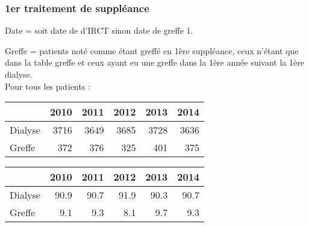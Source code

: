 \documentclass[11pt,a4paper]{article}\usepackage[]{graphicx}\usepackage[]{color}
\begin{document}
% 
% 
% 
% 


    \subsubsection{1er traitement de suppléance}

Date = soit date de d'IRCT sinon date de greffe 1. 

Greffe = patients noté comme étant greffé en 1ère suppléance, ceux n'étant que dans la table greffe et ceux ayant eu une greffe dans la 1ère année suivant la 1ère dialyse.
~\\

Pour tous les patients :

\begin{table}[H]
\centering
\begin{tabular}{lrrrrr}
  \hline
 & 2010 & 2011 & 2012 & 2013 & 2014 \\ 
  \hline
Dialyse & 3716 & 3649 & 3685 & 3728 & 3636 \\ 
  Greffe & 372 & 376 & 325 & 401 & 375 \\ 
   \hline
\end{tabular}
\end{table}
\begin{table}[H]
\centering
\begin{tabular}{lrrrrr}
  \hline
 & 2010 & 2011 & 2012 & 2013 & 2014 \\ 
  \hline
Dialyse & 90.9 & 90.7 & 91.9 & 90.3 & 90.7 \\ 
  Greffe & 9.1 & 9.3 & 8.1 & 9.7 & 9.3 \\ 
   \hline
\end{tabular}
\end{table}
\end{document}
